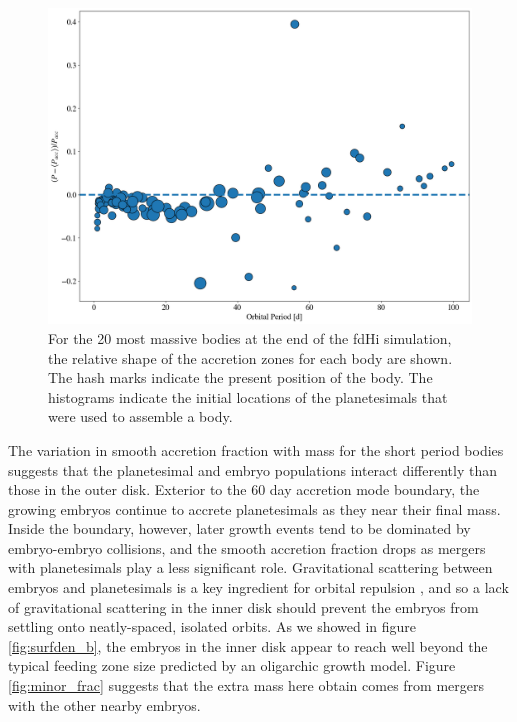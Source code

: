\documentclass[twocolumn,linenumbers]{aastex63}
\begin{document}
\begin{figure}
\begin{center}
    \includegraphics[width=\textwidth]{figures/acc_zones.png}
    \caption{For the 20 most massive bodies at the end of the fdHi simulation, the relative shape of the accretion zones for each body are shown. The hash marks indicate the present position of the body. The histograms indicate the initial locations of the planetesimals that were used to assemble a body.\label{fig:acc_zones}}
\end{center}
\end{figure}

The variation in smooth accretion fraction with mass for the short period bodies suggests that the planetesimal and embryo populations interact differently than those in the outer disk. Exterior to the 60 day accretion mode boundary, the growing embryos continue to accrete planetesimals as they near their final mass. Inside the boundary, however, later growth events tend to be dominated by embryo-embryo collisions, and the smooth accretion fraction drops as mergers with planetesimals play a less significant role. Gravitational scattering between embryos and planetesimals is a key ingredient for orbital repulsion \citep{kokubo98}, and so a lack of gravitational scattering in the inner disk should prevent the embryos from settling onto neatly-spaced, isolated orbits. As we showed in figure \ref{fig:surfden_b}, the embryos in the inner disk appear to reach well beyond the typical feeding zone size predicted by an oligarchic growth model. Figure \ref{fig:minor_frac} suggests that the extra mass here obtain comes from mergers with the other nearby embryos.
\end{document}
